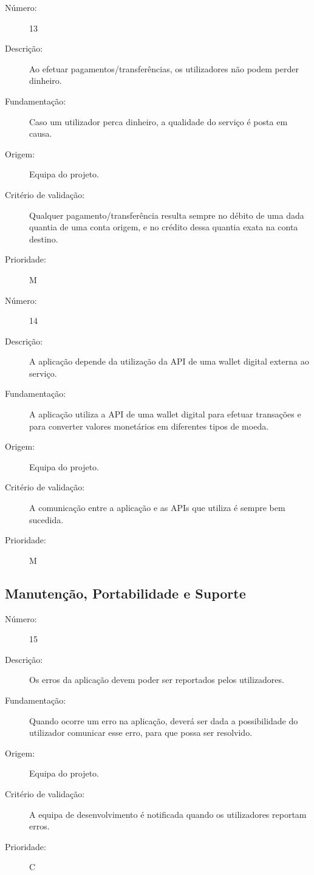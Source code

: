 \documentclass{article}
\begin{document}
     \begin{description}
        \item[Número:]13
        \item[Descrição:]Ao efetuar pagamentos/transferências, os utilizadores não podem perder dinheiro.
        \item[Fundamentação:]Caso um utilizador perca dinheiro, a qualidade do serviço é posta em causa.
        \item[Origem:] Equipa do projeto.
        \item[Critério de validação:] Qualquer pagamento/transferência resulta sempre no débito de uma dada quantia de uma conta origem, e no crédito dessa quantia exata na conta destino.
        \item[Prioridade:]M
      \end{description}
      \vspace{0.5cm}

      \begin{description}
        \item[Número:]14
        \item[Descrição:]A aplicação depende da utilização da API de uma wallet digital externa ao serviço.
        \item[Fundamentação:]A aplicação utiliza a API de uma wallet digital para efetuar transações e para converter valores monetários em diferentes tipos de moeda.
        \item[Origem:]Equipa do projeto.
        \item[Critério de validação:]A comunicação entre a aplicação e as APIs que utiliza é sempre bem sucedida.
        \item[Prioridade:]M
      \end{description}

  \subsection{Manutenção, Portabilidade e Suporte}    

      \begin{description}
        \item[Número:]15
        \item[Descrição:]Os erros da aplicação devem poder ser reportados pelos utilizadores.
        \item[Fundamentação:]Quando ocorre um erro na aplicação, deverá ser dada a possibilidade do utilizador comunicar esse erro, para que possa ser resolvido.
        \item[Origem:] Equipa do projeto.
        \item[Critério de validação:]A equipa de desenvolvimento é notificada quando os utilizadores reportam erros.
        \item[Prioridade:]C
      \end{description}
      \vspace{0.5cm}
\end{document}
